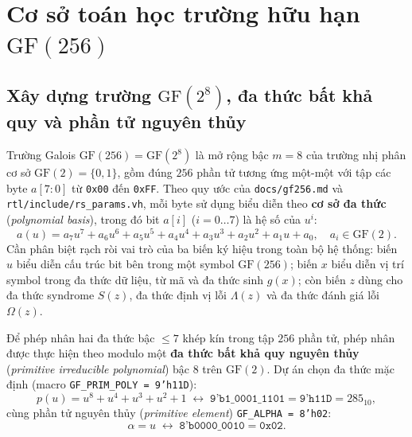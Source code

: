 \documentclass[12pt,a4paper]{report}
\begin{document}
\section{Cơ sở toán học trường hữu hạn \texorpdfstring{$\text{GF}(256)$}{GF(256)}}

\subsection{Xây dựng trường \texorpdfstring{$\text{GF}(2^8)$}{GF(2^8)}, đa thức bất khả quy và phần tử nguyên thủy}

Trường Galois $\text{GF}(256) = \text{GF}(2^8)$ là mở rộng bậc $m = 8$ của trường nhị phân cơ sở $\text{GF}(2) = \{0, 1\}$, gồm đúng $256$ phần tử tương ứng một-một với tập các byte $a[7:0]$ từ \texttt{0x00} đến \texttt{0xFF}. Theo quy ước của \texttt{docs/gf256.md} và \texttt{rtl/include/rs\_params.vh}, mỗi byte sử dụng biểu diễn theo \textbf{cơ sở đa thức} (\textit{polynomial basis}), trong đó bit $a[i]$ ($i = 0 \dots 7$) là hệ số của $u^i$:
\begin{equation}
    a(u) = a_7 u^7 + a_6 u^6 + a_5 u^5 + a_4 u^4 + a_3 u^3 + a_2 u^2 + a_1 u + a_0, \quad a_i \in \text{GF}(2).
    \label{eq:gf-poly-basis}
\end{equation}
Cần phân biệt rạch ròi vai trò của ba biến ký hiệu trong toàn bộ hệ thống: biến $u$ biểu diễn cấu trúc bit bên trong một symbol $\text{GF}(256)$; biến $x$ biểu diễn vị trí symbol trong đa thức dữ liệu, từ mã và đa thức sinh $g(x)$; còn biến $z$ dùng cho đa thức syndrome $S(z)$, đa thức định vị lỗi $\Lambda(z)$ và đa thức đánh giá lỗi $\Omega(z)$.

Để phép nhân hai đa thức bậc $\le 7$ khép kín trong tập $256$ phần tử, phép nhân được thực hiện theo modulo một \textbf{đa thức bất khả quy nguyên thủy} (\textit{primitive irreducible polynomial}) bậc 8 trên $\text{GF}(2)$. Dự án chọn đa thức mặc định (macro \texttt{GF\_PRIM\_POLY = 9'h11D}):
\begin{equation}
    p(u) = u^8 + u^4 + u^3 + u^2 + 1 \;\longleftrightarrow\; \texttt{9'b1\_0001\_1101} = \texttt{9'h11D} = 285_{10},
    \label{eq:prim-poly}
\end{equation}
cùng phần tử nguyên thủy (\textit{primitive element}) \texttt{GF\_ALPHA = 8'h02}:
\begin{equation}
    \alpha = u \;\longleftrightarrow\; \texttt{8'b0000\_0010} = \texttt{0x02}.
    \label{eq:alpha}
\end{equation}
\end{document}
